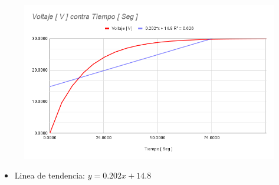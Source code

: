 \documentclass[twocolumn, 12pt]{article}
\begin{document}
\begin{figure}[H]
    \centering
    \includegraphics[width=\linewidth]{./Images/Voltaje [ V ] contra Tiempo [ Seg ].png}
\end{figure}

\begin{itemize}[label=$\triangleright$]
    \item Linea de tendencia:\hfill \break{} $y = 0.202x + 14.8$
\end{itemize}
\end{document}
